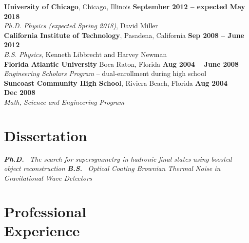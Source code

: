 \documentclass[margin,line]{resume}
\let\origsection\section%
\let\section\subsection%
\let\section\origsection%
\begin{document}
\begin{resume}
\textbf{University of Chicago}, Chicago, Illinois \hfill \textbf{September 2012 -- expected May 2018}\\
\textsl{Ph.D. Physics (expected Spring 2018)}, David Miller\\[5mm]
%
\textbf{California Institute of Technology}, Pasadena, California \hfill \textbf{ Sep 2008 -- June 2012}\\
\textsl{B.S. Physics}, Kenneth Libbrecht and Harvey Newman\\[5mm]
%
\textbf{Florida Atlantic University} Boca Raton, Florida \hfill \textbf{Aug 2004 -- June 2008}\\
\textsl{Engineering Scholars Program} -- dual-enrollment during high school\\[5mm]
%
\textbf{Suncoast Community High School}, Riviera Beach, Florida \hfill \textbf{Aug 2004 -- Dec 2008}\\
\textsl{Math, Science and Engineering Program}

\section{\mysidestyle Dissertation}

\textbf{\textsl{Ph.D.}} \href{https://kratsg.github.io/thesis/}{}~\textsl{The search for supersymmetry in hadronic final states using boosted object reconstruction}
\textbf{\textsl{B.S.}}\hspace{3mm} \href{https://www.dropbox.com/s/h0mpop96cn563bq/Thesis.pdf?dl=0}{}~\textsl{Optical Coating Brownian Thermal Noise in Gravitational Wave Detectors}

\section{\mysidestyle Professional\\Experience}


\end{resume}
\end{document}
